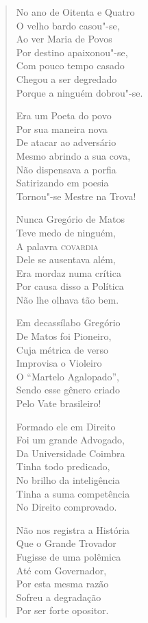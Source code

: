 \begin{verse}
No ano de Oitenta e Quatro \\
O velho bardo casou"-se, \\
Ao ver Maria de Povos \\
Por destino apaixonou"-se, \\
Com pouco tempo casado \\
Chegou a ser degredado \\
Porque a ninguém dobrou"-se. 
\pagebreak

Era um Poeta do povo \\
Por sua maneira nova \\
De atacar ao adversário \\
Mesmo abrindo a sua cova, \\
Não dispensava a porfia \\
Satirizando em poesia \\
Tornou"-se Mestre na Trova! 

Nunca Gregório de Matos \\
Teve medo de ninguém, \\
A palavra \textsc{covardia} \\
Dele se ausentava além, \\
Era mordaz numa crítica \\
Por causa disso a Política \\
Não lhe olhava tão bem. 

Em decassílabo Gregório \\
De Matos foi Pioneiro, \\
Cuja métrica de verso \\
Improvisa o Violeiro \\
O ``Martelo Agalopado'', \\
Sendo esse gênero criado \\
Pelo Vate brasileiro! 

Formado ele em Direito \\
Foi um grande Advogado, \\
Da Universidade Coimbra \\
Tinha todo predicado, \\
No brilho da inteligência \\
Tinha a suma competência \\
No Direito comprovado.
\pagebreak

Não nos registra a História \\
Que o Grande Trovador \\
Fugisse de uma polêmica \\
Até com Governador, \\
Por esta mesma razão \\
Sofreu a degradação \\
Por ser forte opositor. 


\end{verse}
